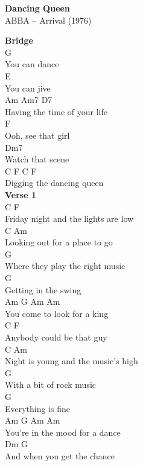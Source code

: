 \documentclass[a4paper]{article}
\begin{document}
    \begin{center}
        \textbf{Dancing Queen}
        ~\\
        ABBA -- Arrival (1976)
    \end{center}
    {
        \scriptsize
        \textbf{Bridge}
        ~\\
        {
            \cutive
            \obeyspaces
G
\\
You can dance
\\
E
\\
You can jive
\\
Am 	   Am7          D7
\\
Having the time of your life
\\
     F  
\\
Ooh, see that girl
\\
Dm7
\\
Watch that scene
\\
            C			F       C       F
\\
Digging the dancing queen
\\

        }
        \textbf{Verse 1}
        ~\\
        {
            \cutive
            \obeyspaces
C                               F
\\
Friday night and the lights are low
\\
C                               Am
\\
Looking out for a place to go
\\
G
\\
Where they play the right music
\\
G
\\
Getting in the swing
\\
            Am                 G Am Am
\\
You come to look for a king
\\
C                              F
\\
Anybody could be that guy
\\
C                              Am
\\
Night is young and the music's high
\\
G
\\
With a bit of rock music
\\
G
\\
Everything is fine
\\
              Am                   G Am Am
\\
You're in the mood for a dance
\\
             Dm                    G
\\
And when you get the chance
\\

}}
\end{document}
